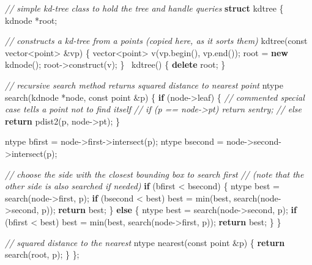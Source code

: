 \documentclass[10pt,]{article}
\newenvironment{Shaded}{}{}
\newcommand{\KeywordTok}[1]{\textcolor[rgb]{0.00,0.44,0.13}{\textbf{{#1}}}}
\newcommand{\DataTypeTok}[1]{\textcolor[rgb]{0.56,0.13,0.00}{{#1}}}
\newcommand{\CommentTok}[1]{\textcolor[rgb]{0.38,0.63,0.69}{\textit{{#1}}}}
\newcommand{\NormalTok}[1]{{#1}}
\begin{document}
\begin{Shaded}
\begin{Highlighting}[]
\CommentTok{// simple kd-tree class to hold the tree and handle queries}
\KeywordTok{struct} \NormalTok{kdtree}
\NormalTok{\{}
    \NormalTok{kdnode *root;}
    
    \CommentTok{// constructs a kd-tree from a points (copied here, as it sorts them)}
    \NormalTok{kdtree(}\DataTypeTok{const} \NormalTok{vector<point> &vp) \{}
        \NormalTok{vector<point> v(vp.begin(), vp.end());}
        \NormalTok{root = }\KeywordTok{new} \NormalTok{kdnode();}
        \NormalTok{root->construct(v);}
    \NormalTok{\}}
    \NormalTok{~kdtree() \{ }\KeywordTok{delete} \NormalTok{root; \}}
    
    \CommentTok{// recursive search method returns squared distance to nearest point}
    \NormalTok{ntype search(kdnode *node, }\DataTypeTok{const} \NormalTok{point &p)}
    \NormalTok{\{}
        \KeywordTok{if} \NormalTok{(node->leaf) \{}
            \CommentTok{// commented special case tells a point not to find itself}
\CommentTok{//            if (p == node->pt) return sentry;}
\CommentTok{//            else               }
                \KeywordTok{return} \NormalTok{pdist2(p, node->pt);}
        \NormalTok{\}}
        
        \NormalTok{ntype bfirst = node->first->intersect(p);}
        \NormalTok{ntype bsecond = node->second->intersect(p);}
        
        \CommentTok{// choose the side with the closest bounding box to search first}
        \CommentTok{// (note that the other side is also searched if needed)}
        \KeywordTok{if} \NormalTok{(bfirst < bsecond) \{}
            \NormalTok{ntype best = search(node->first, p);}
            \KeywordTok{if} \NormalTok{(bsecond < best)}
                \NormalTok{best = min(best, search(node->second, p));}
            \KeywordTok{return} \NormalTok{best;}
        \NormalTok{\}}
        \KeywordTok{else} \NormalTok{\{}
            \NormalTok{ntype best = search(node->second, p);}
            \KeywordTok{if} \NormalTok{(bfirst < best)}
                \NormalTok{best = min(best, search(node->first, p));}
            \KeywordTok{return} \NormalTok{best;}
        \NormalTok{\}}
    \NormalTok{\}}
    
    \CommentTok{// squared distance to the nearest }
    \NormalTok{ntype nearest(}\DataTypeTok{const} \NormalTok{point &p) \{}
        \KeywordTok{return} \NormalTok{search(root, p);}
    \NormalTok{\}}
\NormalTok{\};}
\end{Highlighting}
\end{Shaded}
\end{document}

